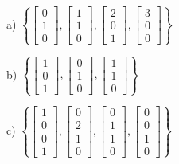 \documentclass{article}
\begin{document}
\begin{flushleft}
\vspace{.25in}

a) $\left\{ \begin{bmatrix}
0 \\ 1 \\ 0
\end{bmatrix}, \begin{bmatrix}
1 \\ 1 \\ 0
\end{bmatrix}, \begin{bmatrix}
2 \\ 0 \\ 1
\end{bmatrix}, \begin{bmatrix}
3 \\ 0 \\ 0
\end{bmatrix} \right\}$

\vspace{1in}

b) $\left\{ \begin{bmatrix}
1 \\ 0 \\ 1
\end{bmatrix}, \begin{bmatrix}
0 \\ 1 \\ 0
\end{bmatrix}, \begin{bmatrix}
1 \\ 1 \\ 0
\end{bmatrix} \right\}$

\vspace{1in}

c) $\left\{ \begin{bmatrix}
1 \\ 0 \\ 0 \\ 1 
\end{bmatrix}, \begin{bmatrix}
0 \\ 2 \\ 1 \\ 0
\end{bmatrix}, \begin{bmatrix}
0 \\ 1 \\ 1 \\ 0
\end{bmatrix}, \begin{bmatrix}
0 \\ 0 \\ 1 \\ 0
\end{bmatrix} \right\}$


\end{flushleft}
\end{document}
